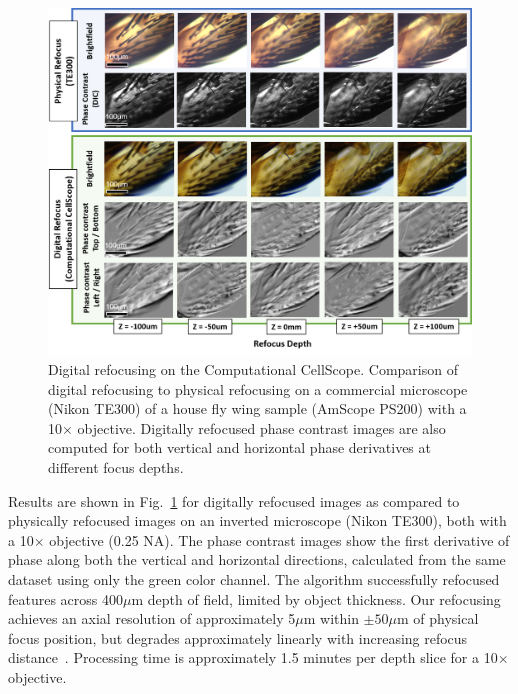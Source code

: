 \begin{figure}
\begin{center}
\includegraphics[width=\textwidth]{figures/fig_ccs_refocus.png}
\end{center}

\caption { {Digital refocusing on the Computational CellScope.} Comparison of digital refocusing to physical refocusing on a commercial microscope (Nikon TE300) of a house fly wing sample (AmScope PS200) with a 10$\times$ objective. Digitally refocused phase contrast images are also computed for both vertical and horizontal phase derivatives at different focus depths.}

\label{fig:digrefocus}
\end{figure}

Results are shown in Fig.~\ref{fig:digrefocus} for digitally refocused images as compared to physically refocused images on an inverted microscope (Nikon TE300), both with a 10$\times$ objective (0.25 NA). The phase contrast images show the first derivative of phase along both the vertical and horizontal directions, calculated from the same dataset using only the green color channel. The algorithm successfully refocused features across 400$\mu$m depth of field, limited by object thickness. Our refocusing achieves an axial resolution of approximately 5$\mu$m within $\pm50\mu$m of physical focus position, but degrades approximately linearly with increasing refocus distance~\cite{Tian14}. Processing time is approximately 1.5 minutes per depth slice for a 10$\times$ objective.


